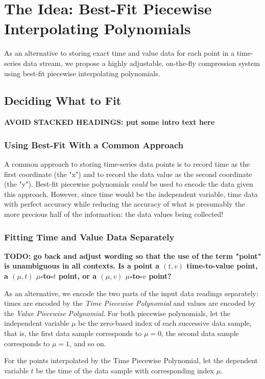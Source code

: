 \documentclass{article}
\begin{document}
\section{The Idea: Best-Fit Piecewise Interpolating Polynomials}
\label{sec:the_idea}
As an alternative to storing exact time and value data for each point in a time-series data stream, we propose a highly adjustable, on-the-fly compression system using best-fit piecewise interpolating polynomials.

\subsection{Deciding What to Fit}
\textbf{AVOID STACKED HEADINGS: put some intro text here}
\subsubsection{Using Best-Fit With a Common Approach}
A common approach to storing time-series data points is to record time as the first coordinate (the "x") and to record the data value as the second coordinate (the "y"). Best-fit piecewise polynomials \textit{could} be used to encode the data given this approach. However, since time would be the independent variable, time data with perfect accuracy while reducing the accuracy of what is presumably the more precious half of the information: the data values being collected!

\subsubsection{Fitting Time and Value Data Separately}
\textbf{TODO: go back and adjust wording so that the use of the term "point" is unambiguous in all contexts. Is a point a \((t,v)\) time-to-value point, a \((\mu,t)\) $\mu$-to-\(t\) point, or a \((\mu,v)\) $\mu$-to-\(v\) point?}

As an alternative, we encode the two parts of the input data readings separately: times are encoded by the \textit{Time Piecewise Polynomial} and values are encoded by the \textit{Value Piecewise Polynomial}. For both piecewise polynomials, let the independent variable $\mu$ be the zero-based index of each successive data sample, that is, the first data sample corresponds to $\mu = 0$, the second data sample corresponds to $\mu = 1$, and so on.

For the points interpolated by the Time Piecewise Polynomial, let the dependent variable \(t\) be the time of the data sample with corresponding index $\mu$.
\end{document}
